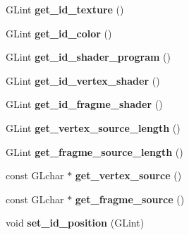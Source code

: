 \begin{DoxyCompactItemize}
\item 
\hypertarget{classShader_a5b7e6535c346214a2ba3ec99292dbdd4}{G\+Lint {\bfseries get\+\_\+id\+\_\+texture} ()}\label{classShader_a5b7e6535c346214a2ba3ec99292dbdd4}

\item 
\hypertarget{classShader_af79004b7246e6764ac7295d7589248f0}{G\+Lint {\bfseries get\+\_\+id\+\_\+color} ()}\label{classShader_af79004b7246e6764ac7295d7589248f0}

\item 
\hypertarget{classShader_ad6a6e43bd572807fc9a953a6b2a3ef9d}{G\+Lint {\bfseries get\+\_\+id\+\_\+shader\+\_\+program} ()}\label{classShader_ad6a6e43bd572807fc9a953a6b2a3ef9d}

\item 
\hypertarget{classShader_a41ebfcbdd94a879d792061f10accdd89}{G\+Lint {\bfseries get\+\_\+id\+\_\+vertex\+\_\+shader} ()}\label{classShader_a41ebfcbdd94a879d792061f10accdd89}

\item 
\hypertarget{classShader_a734d169d6c629fc8736709c4968d40b2}{G\+Lint {\bfseries get\+\_\+id\+\_\+fragme\+\_\+shader} ()}\label{classShader_a734d169d6c629fc8736709c4968d40b2}

\item 
\hypertarget{classShader_a6cf65e9e7d4c32f291f8459147892c74}{G\+Lint {\bfseries get\+\_\+vertex\+\_\+source\+\_\+length} ()}\label{classShader_a6cf65e9e7d4c32f291f8459147892c74}

\item 
\hypertarget{classShader_a777e9d01476d05d903046d56b101a6d7}{G\+Lint {\bfseries get\+\_\+fragme\+\_\+source\+\_\+length} ()}\label{classShader_a777e9d01476d05d903046d56b101a6d7}

\item 
\hypertarget{classShader_a542ce38b62b30f0dee196a26d592f832}{const G\+Lchar $\ast$ {\bfseries get\+\_\+vertex\+\_\+source} ()}\label{classShader_a542ce38b62b30f0dee196a26d592f832}

\item 
\hypertarget{classShader_a5a428e47bd98890bf28971533130f7fd}{const G\+Lchar $\ast$ {\bfseries get\+\_\+fragme\+\_\+source} ()}\label{classShader_a5a428e47bd98890bf28971533130f7fd}

\item 
\hypertarget{classShader_ac8585f98b706b27e44ea126b912c2ef7}{void {\bfseries set\+\_\+id\+\_\+position} (G\+Lint)}\label{classShader_ac8585f98b706b27e44ea126b912c2ef7}


\end{DoxyCompactItemize}
